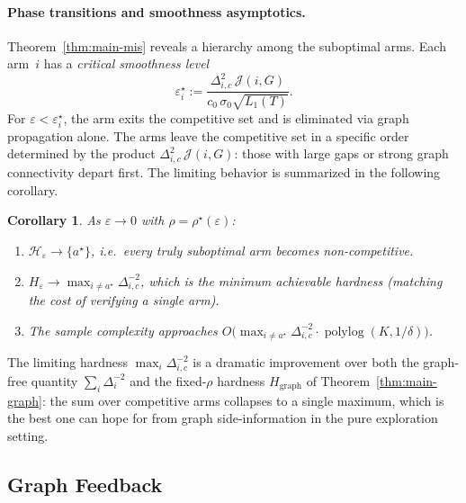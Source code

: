 \documentclass{article}
\newtheorem{corollary}[theorem]{Corollary}
\begin{document}
\paragraph{Phase transitions and smoothness asymptotics.}
Theorem~\ref{thm:main-mis} reveals a hierarchy among the suboptimal arms. Each
arm~$i$ has a \emph{critical smoothness level}
\begin{equation}
\label{eq:eps-crit}
\varepsilon_i^\star
:=
\frac{\Delta_{i,c}^2\,\mathcal J(i,G)}
     {c_0\,\sigma_0\sqrt{L_1(T)}}.
\end{equation}
For $\varepsilon<\varepsilon_i^\star$, the arm exits the competitive set and is
eliminated via graph propagation alone. The arms leave the competitive set in a
specific order determined by the product
$\Delta_{i,c}^2\,\mathcal J(i,G)$: those with large gaps or strong graph
connectivity depart first. The limiting behavior is summarized in the following
corollary.

\begin{corollary}\label{cor:eps-limit}
As $\varepsilon\to 0$ with $\rho=\rho^\star(\varepsilon)$:
\begin{enumerate}[leftmargin=*,label=(\roman*)]
\item $\mathcal H_\varepsilon\to\{a^\star\}$,
      i.e.\ every truly suboptimal arm becomes non-competitive.
\item $H_\varepsilon\to
      \max_{i\neq a^\star}\Delta_{i,c}^{-2}$,
      which is the minimum achievable hardness (matching the cost of verifying a single arm).
\item The sample complexity approaches
      $O\!\bigl(\max_{i\neq a^\star}\Delta_{i,c}^{-2}
      \cdot\operatorname{polylog}(K,1/\delta)\bigr)$.
\end{enumerate}
\end{corollary}

The limiting hardness $\max_i\Delta_{i,c}^{-2}$ is a dramatic improvement over
both the graph-free quantity $\sum_i\Delta_i^{-2}$ and the fixed-$\rho$ hardness
$H_{\mathrm{graph}}$ of Theorem~\ref{thm:main-graph}: the sum over competitive
arms collapses to a single maximum, which is the best one can hope for from graph
side-information in the pure exploration setting.


\subsection{Graph Feedback}\label{sec:graph-feedback}
\end{document}
